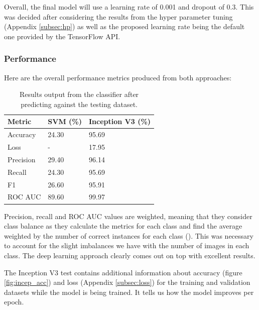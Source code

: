 \documentclass{article}
\begin{document}
\par

Overall, the final model will use a learning rate of 0.001 and dropout of 0.3. This was decided after considering the 
results from the hyper parameter tuning (Appendix \ref{subsec:hp}) as well as the proposed learning rate being the 
default one provided by the TensorFlow API.

\subsubsection*{Performance}

Here are the overall performance metrics produced from both approaches:

\begin{table}[h!]
    \centering
    \begin{tabular}{ |m{3cm}|m{3cm}|m{3cm}| }
        \hline
        Metric & SVM (\%) & Inception V3 (\%) \\
        \hline
        Accuracy & 24.30 & 95.69 \\
        \hline
        Loss & - & 17.95 \\
        \hline
        Precision & 29.40 & 96.14 \\
        \hline
        Recall & 24.30 & 95.69 \\
        \hline
        F1 & 26.60 & 95.91 \\
        \hline
        ROC AUC & 89.60 & 99.97 \\
        \hline
    \end{tabular}
    \caption{Results output from the classifier after predicting against the testing dataset.}
    \label{table:2}
\end{table}

\break

Precision, recall and ROC AUC values are weighted, meaning that they consider class balance as they calculate the metrics
for each class and find the average weighted by the number of correct instances for each class 
(\cite{scikitprec}). This was necessary to account for the slight imbalances we have with the number of images 
in each class. The deep learning approach clearly comes out on top with excellent results.

\par

The Inception V3 test contains additional information about accuracy (figure \ref{fig:incep_acc}) and loss 
(Appendix \ref{subsec:loss}) for the training and validation datasets 
while the model is being trained. It tells us how the model improves per epoch.
\end{document}
